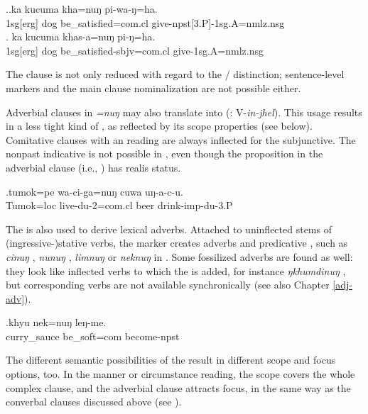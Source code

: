 \ex.\ag.ka kucuma kha=nuŋ pi-wa-ŋ=ha.\\
{\sc 1sg[erg]} dog   be\_satisfied{\sc [sbjv;3sg]=com.cl} give{\sc -npst[3.P]-1sg.A=nmlz.nsg}\\
\bg. ka kucuma khas-a=nuŋ pi-ŋ=ha.\\
{\sc 1sg[erg]} dog   be\_satisfied{\sc [3sg]-sbjv=com.cl} give{\sc [pst;3.P]-1sg.A=nmlz.nsg}\\

The clause is not only reduced with regard to the / distinction; sentence-level markers and the main clause nominalization are not possible either. 

Adverbial clauses in \emph{=nuŋ} may also  translate into  (: V-\emph{in-jhel}). This usage results in a less tight kind of , as reflected by its scope properties (see below). Comitative clauses with an  reading are always inflected for the subjunctive. The nonpast indicative is not possible in \Next, even though the proposition in the adverbial clause (i.e., ) has realis status.%

\exg.\label{ex-nung}tumok=pe wa-ci-ga=nuŋ cuwa uŋ-a-c-u.\\
Tumok{\sc =loc} live{\sc [sbjv]-du-2=com.cl} beer    drink{\sc -imp-du-3.P}\\


The  is also used to derive lexical adverbs. Attached to uninflected stems of (ingressive-)stative verbs, the marker creates adverbs and predicative , such as \emph{cinuŋ} , \emph{nunuŋ} , \emph{limnuŋ}  or \emph{neknuŋ}  in \Next.  Some fossilized adverbs are found as well: they look like inflected verbs to which the  is added, for instance \emph{ŋkhumdinuŋ} , but corresponding verbs are not available synchronically (see also Chapter \ref{adj-adv}).
 
\exg.khyu  nek=nuŋ leŋ-me.\\
curry\_sauce    be\_soft{\sc =com} become{\sc [3sg]-npst}\\
 


The different semantic possibilities of the  result in different scope and focus options, too. In the manner or circumstance reading, the  scope covers the whole complex clause, and the adverbial clause attracts focus, in the same way as the  converbal clauses discussed above (see \Next[a]). 

